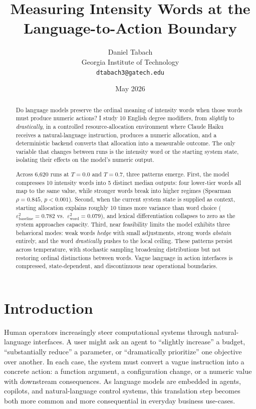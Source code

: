 \documentclass[11pt]{article}
\title{Measuring Intensity Words at the Language-to-Action Boundary}
\author{Daniel Tabach\\Georgia Institute of Technology\\\texttt{dtabach3@gatech.edu}}
\date{May 2026}
\begin{document}
\maketitle

\begin{abstract}
Do language models preserve the ordinal meaning of intensity words when those words must produce numeric actions? I study 10 English degree modifiers, from \textit{slightly} to \textit{drastically}, in a controlled resource-allocation environment where Claude Haiku receives a natural-language instruction, produces a numeric allocation, and a deterministic backend converts that allocation into a measurable outcome. The only variable that changes between runs is the intensity word or the starting system state, isolating their effects on the model's numeric output.

Across 6,620 runs at $T{=}0.0$ and $T{=}0.7$, three patterns emerge. First, the model compresses 10 intensity words into 5 distinct median outputs: four lower-tier words all map to the same value, while stronger words break into higher regimes (Spearman $\rho = 0.845$, $p < 0.001$). Second, when the current system state is supplied as context, starting allocation explains roughly 10 times more variance than word choice ($\varepsilon^2_\text{baseline} = 0.782$ vs.\ $\varepsilon^2_\text{word} = 0.079$), and lexical differentiation collapses to zero as the system approaches capacity. Third, near feasibility limits the model exhibits three behavioral modes: weak words \textit{hedge} with small adjustments, strong words \textit{abstain} entirely, and the word \textit{drastically} pushes to the local ceiling. These patterns persist across temperature, with stochastic sampling broadening distributions but not restoring ordinal distinctions between words. Vague language in action interfaces is compressed, state-dependent, and discontinuous near operational boundaries.
\end{abstract}

\section{Introduction}

Human operators increasingly steer computational systems through natural-language interfaces. A user might ask an agent to ``slightly increase'' a budget, ``substantially reduce'' a parameter, or ``dramatically prioritize'' one objective over another. In each case, the system must convert a vague instruction into a concrete action: a function argument, a configuration change, or a numeric value with downstream consequences. As language models are embedded in agents, copilots, and natural-language control systems, this translation step becomes both more common and more consequential in everyday business use-cases.
\end{document}
